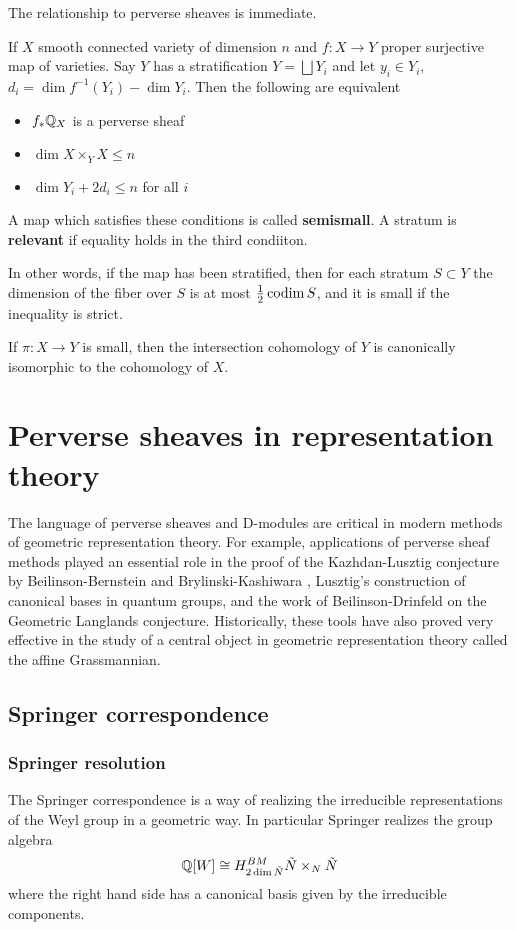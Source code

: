 \documentclass[12pt]{article}
\begin{document}
The relationship to perverse sheaves is immediate. \begin{proposition}
    If $X$ smooth connected variety of dimension $n$ and 
    $f:X\to Y$ proper surjective map of varieties. Say $Y$ has
    a stratification $Y = \bigsqcup Y_i$ and let $y_i\in Y_i$, $d_i = 
    \dim f^{-1}(Y_i) - \dim Y_i$. Then the following are equivalent \begin{itemize}
        \item $f_*\mathbb{Q}_X$ is a perverse sheaf
        \item $\dim X \times_Y X \leq n$
        \item $\dim Y_i + 2d_i \leq n$ for all $i$
    \end{itemize}
A map which satisfies these conditions is called \textbf{semismall}.
A stratum is \textbf{relevant} if equality holds in the third condiiton.
\end{proposition}
In other words, if the map has been stratified, then for each stratum $S\subset Y$ the dimension of 
the fiber over $S$ is at most $\frac{1}{2} \operatorname{codim} S$, and it is small 
if the inequality is strict.

\begin{proposition}
    If $\pi:X\to Y$ is small, then the intersection 
    cohomology of $Y$ is canonically isomorphic to the
    cohomology of $X$.
\end{proposition}

\section{Perverse sheaves in representation theory}
The language of perverse sheaves and D-modules are critical 
in modern methods of geometric representation theory. 
For example, applications of perverse sheaf methods played an essential
 role in the proof of the Kazhdan-Lusztig conjecture
 by Beilinson-Bernstein and Brylinski-Kashiwara
, Lusztig’s construction of canonical bases in quantum groups, and the work of Beilinson-Drinfeld on 
the Geometric Langlands conjecture. 
Historically, these tools have also proved very effective in the study of a 
central object in geometric representation theory called the affine Grassmannian. 

\subsection{Springer correspondence}
\subsubsection{Springer resolution}
The Springer correspondence is a way of realizing 
the irreducible representations of the Weyl group in a geometric way. In particular 
Springer realizes the group algebra \begin{align*}
    \mathbb{Q}[W] \cong H^{BM}_{2\dim \tilde N}{\tilde N\times_N \tilde N}
\end{align*} where the right hand side 
has a canonical basis given by the irreducible components.
\end{document}

